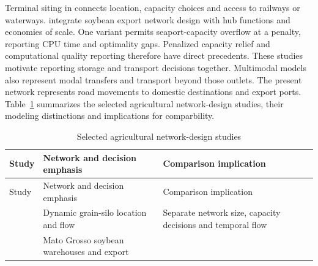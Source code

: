 \documentclass[
  english,
  11pt,
  a4paper,
  authoryear,
  preprint]{elsarticle}
\begin{document}
Terminal siting in \citet{morais2023} connects location, capacity
choices and access to railways or waterways. \citet{milanez2026}
integrate soybean export network design with hub functions and economies
of scale. One variant permits seaport-capacity overflow at a penalty, reporting CPU time and optimality gaps. Penalized capacity relief
and computational quality reporting therefore have direct precedents.
These studies motivate reporting storage and transport decisions
together. Multimodal models also represent modal
transfers and transport beyond those outlets.
The present network represents road movements to domestic destinations and export ports.
Table~\ref{tbl-literature} summarizes the selected agricultural network-design studies, their
modeling distinctions and implications for comparbility.

\begin{longtable}[]{@{}
  >{\raggedright\arraybackslash}p{}
  >{\raggedright\arraybackslash}p{}
  >{\raggedright\arraybackslash}p{}@{}}
\caption{Selected agricultural network-design studies}\label{tbl-literature}\tabularnewline
\toprule\noalign{}
\begin{minipage}[b]{\linewidth}\raggedright
Study
\end{minipage} & \begin{minipage}[b]{\linewidth}\raggedright
Network and decision emphasis
\end{minipage} & \begin{minipage}[b]{\linewidth}\raggedright
Comparison implication
\end{minipage} \\
\midrule\noalign{}
\endfirsthead
\toprule\noalign{}
\begin{minipage}[b]{\linewidth}\raggedright
Study
\end{minipage} & \begin{minipage}[b]{\linewidth}\raggedright
Network and decision emphasis
\end{minipage} & \begin{minipage}[b]{\linewidth}\raggedright
Comparison implication
\end{minipage} \\
\midrule\noalign{}
\endhead
\bottomrule\noalign{}
\endlastfoot
\citet{foulds2005} & Dynamic grain-silo location and flow & Separate
network size, capacity decisions and temporal flow \\
\citet{mascarenhas2014} & Mato Grosso soybean warehouses and export

\end{longtable}
\end{document}
